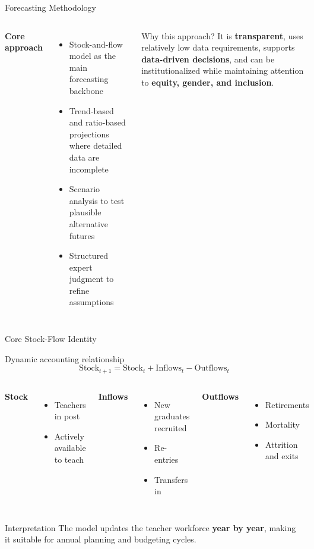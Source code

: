 \documentclass[aspectratio=169,11pt]{beamer}
\newcommand{\highlight}[1]{\textcolor{DavidsonBlueDark}{\textbf{#1}}}
\begin{document}
\begin{frame}{Forecasting Methodology}
\begin{columns}[T,onlytextwidth]
\textbf{Core approach}
\begin{itemize}
  \item Stock-and-flow model as the main forecasting backbone
  \item Trend-based and ratio-based projections where detailed data are incomplete
  \item Scenario analysis to test plausible alternative futures
  \item Structured expert judgment to refine assumptions
\end{itemize}
\begin{block}{Why this approach?}
\justifying
It is \highlight{transparent}, uses relatively low data requirements, supports \highlight{data-driven decisions}, and can be institutionalized while maintaining attention to \highlight{equity, gender, and inclusion}.
\end{block}
\end{columns}
\end{frame}

\begin{frame}{Core Stock-Flow Identity}
\begin{block}{Dynamic accounting relationship}
\[
\mathrm{Stock}_{t+1} = \mathrm{Stock}_{t} + \mathrm{Inflows}_{t} - \mathrm{Outflows}_{t}
\]
\end{block}
\vspace{0.15cm}
\begin{columns}[T,onlytextwidth]
\textbf{Stock}
\begin{itemize}
  \item Teachers in post
  \item Actively available to teach
\end{itemize}
\textbf{Inflows}
\begin{itemize}
  \item New graduates recruited
  \item Re-entries
  \item Transfers in
\end{itemize}
\textbf{Outflows}
\begin{itemize}
  \item Retirements
  \item Mortality
  \item Attrition and exits
\end{itemize}
\end{columns}
\vspace{0.2cm}
\begin{block}{Interpretation}
The model updates the teacher workforce \highlight{year by year}, making it suitable for annual planning and budgeting cycles.
\end{block}
\end{frame}
\end{document}
